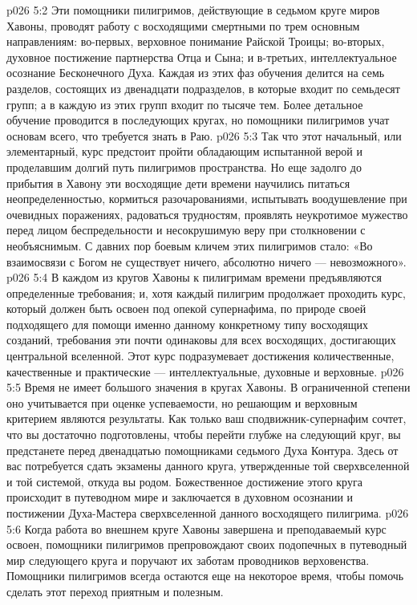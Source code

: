 \vs p026 5:2 Эти помощники пилигримов, действующие в седьмом круге миров Хавоны, проводят работу с восходящими смертными по трем основным направлениям: во\hyp{}первых, верховное понимание Райской Троицы; во\hyp{}вторых, духовное постижение партнерства Отца и Сына; и в\hyp{}третьих, интеллектуальное осознание Бесконечного Духа. Каждая из этих фаз обучения делится на семь разделов, состоящих из двенадцати подразделов, в которые входит по семьдесят групп; а в каждую из этих групп входит по тысяче тем. Более детальное обучение проводится в последующих кругах, но помощники пилигримов учат основам всего, что требуется знать в Раю.
\vs p026 5:3 Так что этот начальный, или элементарный, курс предстоит пройти обладающим испытанной верой и проделавшим долгий путь пилигримов пространства. Но еще задолго до прибытия в Хавону эти восходящие дети времени научились питаться неопределенностью, кормиться разочарованиями, испытывать воодушевление при очевидных поражениях, радоваться трудностям, проявлять неукротимое мужество перед лицом беспредельности и несокрушимую веру при столкновении с необъяснимым. С давних пор боевым кличем этих пилигримов стало: «Во взаимосвязи с Богом не существует ничего, абсолютно ничего --- невозможного».
\vs p026 5:4 В каждом из кругов Хавоны к пилигримам времени предъявляются определенные требования; и, хотя каждый пилигрим продолжает проходить курс, который должен быть освоен под опекой супернафима, по природе своей подходящего для помощи именно данному конкретному типу восходящих созданий, требования эти почти одинаковы для всех восходящих, достигающих центральной вселенной. Этот курс подразумевает достижения количественные, качественные и практические --- интеллектуальные, духовные и верховные.
\vs p026 5:5 Время не имеет большого значения в кругах Хавоны. В ограниченной степени оно учитывается при оценке успеваемости, но решающим и верховным критерием являются результаты. Как только ваш сподвижник\hyp{}супернафим сочтет, что вы достаточно подготовлены, чтобы перейти глубже на следующий круг, вы предстанете перед двенадцатью помощниками седьмого Духа Контура. Здесь от вас потребуется сдать экзамены данного круга, утвержденные той сверхвселенной и той системой, откуда вы родом. Божественное достижение этого круга происходит в путеводном мире и заключается в духовном осознании и постижении Духа\hyp{}Мастера сверхвселенной данного восходящего пилигрима.
\vs p026 5:6 Когда работа во внешнем круге Хавоны завершена и преподаваемый курс освоен, помощники пилигримов препровождают своих подопечных в путеводный мир следующего круга и поручают их заботам проводников верховенства. Помощники пилигримов всегда остаются еще на некоторое время, чтобы помочь сделать этот переход приятным и полезным.
